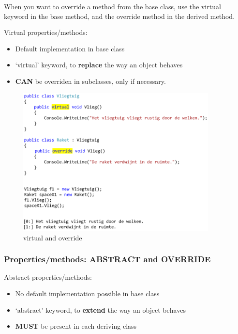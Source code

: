 \documentclass{article}
\newcommand{\bold}[1]{\textbf{#1}}
\begin{document}
When you want to override a method from the base class, 
use the virtual keyword in the base method,
and the override method in the derived method.

Virtual properties/methods:
\begin{itemize}
    \item Default implementation in base class
    \item `virtual' keyword, to \bold{replace} the way an object behaves
    \item \bold{CAN} be overriden in subclasses, only if necessary.
\end{itemize}

\begin{figure}[H]
    \centering
    \includegraphics[width=0.9\textwidth]{inheritance-override.png}
    \caption{virtual and override}
\end{figure}


\subsubsection{Properties/methods: ABSTRACT and OVERRIDE}

Abstract properties/methods:

\begin{itemize}
    \item No default implementation possible in base class
    \item `abstract' keyword, to \bold{extend} the way an object behaves
    \item \bold{MUST} be present in each deriving class
\end{itemize}
\end{document}
